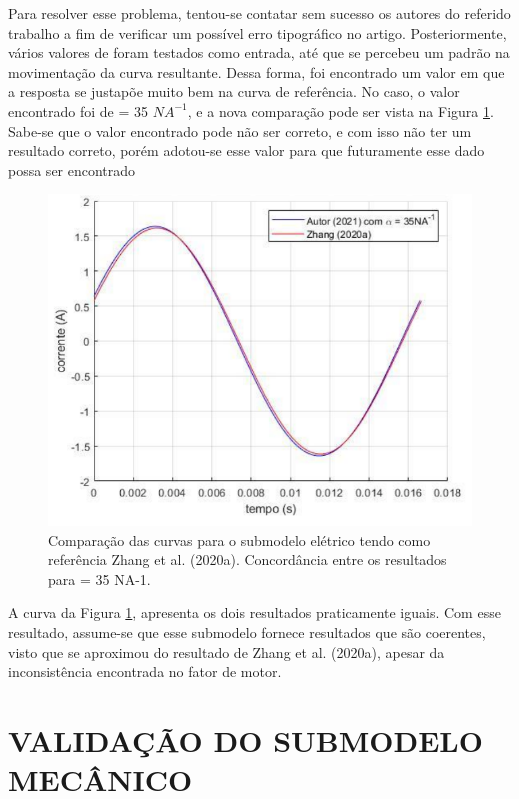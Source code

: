 Para resolver esse problema, tentou-se contatar sem sucesso os autores do referido trabalho a fim de verificar um possível erro tipográfico no artigo. Posteriormente, vários valores de  foram testados como entrada, até que se percebeu um padrão na movimentação da curva resultante. Dessa forma, foi encontrado um valor em que a resposta se justapõe muito bem na curva de referência. No caso, o valor encontrado foi de  = 35 $NA^{-1}$, e a nova comparação pode ser vista na Figura \ref{fig:comp_e_35}. Sabe-se que o valor encontrado pode não ser correto, e com isso não ter um resultado correto, porém adotou-se esse valor para que futuramente esse dado possa ser encontrado 




 \begin{figure}[h]
	\caption{\label{fig:comp_e_35}Comparação das curvas para o submodelo elétrico tendo como referência Zhang et al. (2020a). Concordância entre os resultados para  = 35 NA-1.}
	\begin{center}
		\includegraphics[scale=0.55]{images/e_35.png}
	\end{center}
\end{figure}

A curva da Figura \ref{fig:comp_e_35}, apresenta os dois resultados praticamente iguais. Com esse resultado, assume-se que esse submodelo fornece resultados que são coerentes, visto que se aproximou do resultado de Zhang et al. (2020a), apesar da inconsistência encontrada no fator de motor. 
\vfill

\section{VALIDAÇÃO DO SUBMODELO MECÂNICO}

